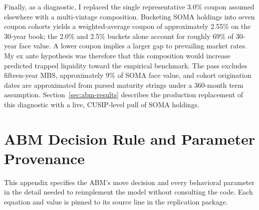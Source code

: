 \documentclass[12pt]{article}
\begin{document}
Finally, as a diagnostic, I replaced the single representative 3.0\% coupon assumed elsewhere with a multi-vintage composition. Bucketing SOMA holdings into seven coupon cohorts yields a weighted-average coupon of approximately 2.55\% on the 30-year book; the 2.0\% and 2.5\% buckets alone account for roughly 69\% of 30-year face value. A lower coupon implies a larger gap to prevailing market rates. My ex ante hypothesis was therefore that this composition would increase predicted trapped liquidity toward the empirical benchmark. The pass excludes fifteen-year MBS, approximately 9\% of SOMA face value, and cohort origination dates are approximated from parsed maturity strings under a 360-month term assumption. Section~\ref{sec:abm-results} describes the production replacement of this diagnostic with a live, CUSIP-level pull of SOMA holdings.

\section{ABM Decision Rule and Parameter Provenance}\label{app:abmspec}

This appendix specifies the ABM's move decision and every behavioral parameter in the detail needed to reimplement the model without consulting the code. Each equation and value is pinned to its source line in the replication package.
\end{document}
